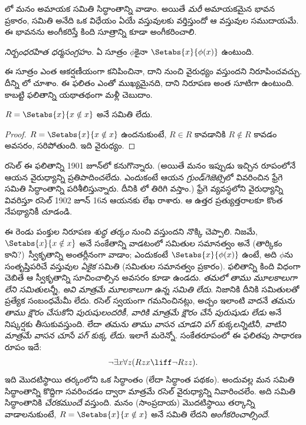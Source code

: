 \documentclass[../../../include/open-logic-section]{subfiles}
\begin{document}

లో మనం
అమాయక సమితి సిద్ధాంతాన్ని వాడాం. అయితే \emph{మరీ}
అమాయకమైన భావన ప్రకారం, సమితి అనేది ఒక విధేయం
ఏయే వస్తువులకు వర్తిస్తుందో ఆ వస్తువుల సముదాయమే.
ఈ భావనను అంగీకరిస్తే కింది సూత్రాన్ని కూడా అంగీకరించాలి.

\begin{defish}
  \emph{నిర్బంధరహిత ధర్మసంగ్రహం.}
  ఏ సూత్రం $\phi$కైనా
  $\Setabs{x}{\phi(x)}$ ఉంటుంది.
\end{defish}

ఈ సూత్రం ఎంత ఆకర్షణీయంగా కనిపించినా,
దాని నుంచి వైరుధ్యం వస్తుందని నిరూపించవచ్చు.
దీన్ని లో చూశాం.
ఈ ఫలితం ఎంతో ముఖ్యమైనది, దాని నిరూపణ అంత సూటిగా ఉంటుంది.
కాబట్టి ఫలితాన్ని యథాతథంగా మళ్లీ చెబుదాం.

\begin{thm}[రసెల్ వైరుధ్యం]
$R = \Setabs{x}{x \notin x}$
అనే సమితి లేదు.
\end{thm}

\begin{proof}
$R = \Setabs{x}{x \notin x}$
ఉందనుకుంటే, $R \in R$ కావడానికి $R \notin R$ కావడం అవసరం, సరిపోతుంది.
ఇది వైరుధ్యం.
\end{proof}

రసెల్ ఈ ఫలితాన్ని 1901 జూన్‌లో
కనుగొన్నారు. (అయితే మనం ఇప్పుడు
ఇచ్చిన రూపంలోనే ఆయన వైరుధ్యాన్ని
ప్రతిపాదించలేదు. ఎందుకంటే ఆయన
\emph{గ్రుండ్‌గెజెట్సె}లో వివరించిన
ఫ్రేగె సమితి సిద్ధాంతాన్ని
పరిశీలిస్తున్నారు. దీనికి
లో తిరిగి వస్తాం.)
ఫ్రేగె వ్యవస్థలోని వైరుధ్యాన్ని
వివరిస్తూ రసెల్ 1902 జూన్ 16న
ఆయనకు లేఖ రాశారు. ఆ ఉత్తర
ప్రత్యుత్తరాలకూ కొంత నేపథ్యానికీ
\citet[pp.~124--8]{Heijenoort1967}
చూడండి.

ఈ రెండు పంక్తుల నిరూపణ
\emph{శుద్ధ తర్కం} నుంచి
వస్తుందని నొక్కి చెప్పాలి.
నిజమే, $\Setabs{x}{x \notin x}$
అనే సంకేతాన్ని వాడటంలో
సమితుల సమానత్వం అనే
(తార్కికం కాని?)\ స్వీకృతాన్ని
అంతర్లీనంగా వాడాం;
ఎందుకంటే $\Setabs{x}{\phi(x)}$
ఉంటే, అది $\phi$ను
సంతృప్తిపరిచే వస్తువుల
\emph{ఏకైక} సమితి
(సమితుల సమానత్వం ప్రకారం).
ఫలితాన్ని కింది విధంగా చెబితే ఆ స్వీకృతాన్ని
సూచించాల్సిన అవసరం కూడా ఉండదు.
\emph{తమలో తాము మూలకాలుగా లేని సమితులన్నీ,
అవి మాత్రమే మూలకాలుగా ఉన్న సమితి లేదు}.
నిజానికి దీనికి సమితులతో
ప్రత్యేక సంబంధమేమీ లేదు.
రసెల్ స్వయంగా గమనించినట్లు,
అచ్చం ఇలాంటి వాదనే
\emph{తమను తాము క్షౌరం
చేసుకోని పురుషులందరికీ, వారికి మాత్రమే
క్షౌరం చేసే పురుషుడు లేడు}
అనే నిష్కర్షకు తీసుకువస్తుంది.
లేదా \emph{తమను తాము
వాసన చూడని పగ్ కుక్కలన్నిటినీ, వాటిని మాత్రమే
వాసన చూసే
పగ్ కుక్క లేదు}.
ఇలాగే మరెన్నో. సంకేతరూపంలో
ఈ ఫలితపు సాధారణ రూపం ఇదే:
\[
\lnot \exists x \forall z(Rzx \liff \lnot R zz).
\]
ఇది మొదటిస్థాయి తర్కంలోని ఒక సిద్ధాంతం
(లేదా సిద్ధాంత పథకం). అందువల్ల
మన సమితి సిద్ధాంతాన్ని
కొద్దిగా సవరించడం ద్వారా
మాత్రమే రసెల్ వైరుధ్యాన్ని
నివారించలేం. అది సమితి
సిద్ధాంతానికి \emph{చేరకముందే}
వస్తుంది. మనం (సాంప్రదాయ)
మొదటిస్థాయి తర్కాన్ని వాడాలనుకుంటే,
$R = \Setabs{x}{x\notin x}$
అనే సమితి లేదని
\emph{అంగీకరించాల్సిందే}.
\end{document}
